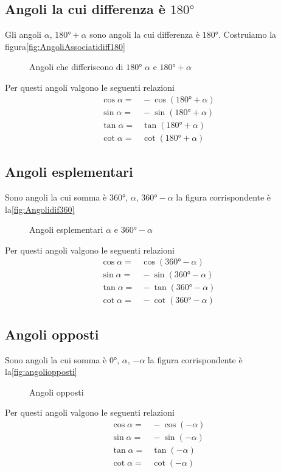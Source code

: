 \subsection{Angoli la cui differenza è $\ang{180}$}
\label{sub:Dif180}
Gli angoli $\alpha$, $\ang{180}+\alpha$ sono angoli la cui differenza è $\ang{180}$.  Costruiamo la figura\nobs\vref{fig:AngoliAssociatidiff180}
\begin{figure}
	\centering
	
	\caption{Angoli che differiscono di $\ang{180}$ $\alpha$ e $\ang{180}+\alpha$}
			\label{fig:AngoliAssociatidiff180}
\end{figure}
Per questi angoli valgono le seguenti relazioni
\begin{align*}
\cos\alpha=&{}-\cos(\ang{180}+\alpha)\\
\sin\alpha=&{}-\sin(\ang{180}+\alpha)\\
\tan\alpha=&{}\tan(\ang{180}+\alpha)\\
\cot\alpha=&{}\cot(\ang{180}+\alpha)
\end{align*}
\subsection{Angoli esplementari}
Sono angoli la cui somma è $\ang{360}$, $\alpha$, $\ang{360}-\alpha$ la figura corrispondente è la\nobs\vref{fig:Angolidif360}
\begin{figure} %
		\centering
			
			\caption{Angoli esplementari $\alpha$ e $\ang{360}-\alpha$}
			\label{fig:Angolidif360}
	\end{figure}
Per questi angoli valgono le seguenti relazioni
\begin{align*}
\cos\alpha=&{}\cos(\ang{360}-\alpha)\\
\sin\alpha=&{}-\sin(\ang{360}-\alpha)\\
\tan\alpha=&{}-\tan(\ang{360}-\alpha)\\
\cot\alpha=&{}-\cot(\ang{360}-\alpha)
\end{align*}
\subsection{Angoli opposti}
Sono angoli la cui somma è $\ang{0}$, $\alpha$, $-\alpha$ la figura corrispondente è la\nobs\vref{fig:angoliopposti}
\begin{figure} %
	\centering
	
	\caption{Angoli opposti}
	\label{fig:angoliopposti}
\end{figure}
Per questi angoli valgono le seguenti relazioni
\begin{align*}
\cos\alpha=&{}-\cos(-\alpha)\\
\sin\alpha=&{}-\sin(-\alpha)\\
\tan\alpha=&{}\tan(-\alpha)\\
\cot\alpha=&{}\cot(-\alpha)
\end{align*}
